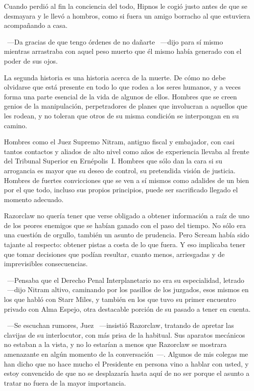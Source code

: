 Cuando perdió al fin la conciencia del todo, Hipnos le cogió justo antes de que se desmayara y le llevó a hombros, como si fuera un amigo borracho al que estuviera acompañando a casa.

~---Da gracias de que tengo órdenes de no dañarte ~---dijo para sí mismo mientras arrastraba con aquel peso muerto que él mismo había generado con el poder de sus ojos.

\parbreak
La segunda historia es una historia acerca de la muerte. De cómo no debe olvidarse que está presente en todo lo que rodea a los seres humanos, y a veces forma una parte esencial de la vida de algunos de ellos. Hombres que se creen genios de la manipulación, perpetradores de planes que involucran a aquellos que les rodean, y no toleran que otros de su misma condición se interpongan en su camino.

Hombres como el Juez Supremo Nitram, antiguo fiscal y embajador, con casi tantos contactos y aliados de alto nivel como años de experiencia llevaba al frente del Tribunal Superior en Ernépolis~I. Hombres que sólo dan la cara si su arrogancia es mayor que su deseo de control, su pretendida visión de justicia. Hombres de fuertes convicciones que se ven a sí mismos como adalides de un bien por el que todo, incluso sus propios principios, puede ser sacrificado llegado el momento adecuado.

Razorclaw no quería tener que verse obligado a obtener información a raíz de uno de los peores enemigos que se habían ganado con el paso del tiempo. No sólo era una cuestión de orgullo, también un asunto de prudencia. Pero Scream había sido tajante al respecto: obtener pistas a costa de lo que fuera. Y eso implicaba tener que tomar decisiones que podían resultar, cuanto menos, arriesgadas y de imprevisibles consecuencias.

~---Pensaba que el Derecho Penal Interplanetario no era su especialidad, letrado ~---dijo Nitram altivo, caminando por los pasillos de los juzgados, esos mismos en los que habló con Starr Miles, y también en los que tuvo su primer encuentro privado con Alma Espejo, otra destacable porción de su pasado a tener en cuenta.

~---Se escuchan rumores, Juez ~---insistió Razorclaw, tratando de apretar las clavijas de su interlocutor, con más prisa de la habitual. Sus aparatos mecánicos no estaban a la vista, y no lo estarían a menos que Razorclaw se mostrara amenazante en algún momento de la conversación~---. Algunos de mis colegas me han dicho que no hace mucho el Presidente en persona vino a hablar con usted, y estoy convencido de que no se desplazaría hasta aquí de no ser porque el asunto a tratar no fuera de la mayor importancia.

